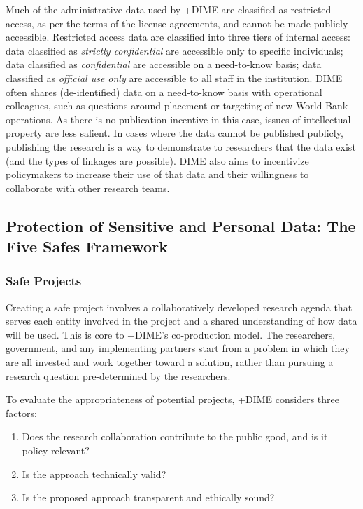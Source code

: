 \documentclass[
]{WileySix}
\providecommand{\tightlist}{%
  \setlength{\itemsep}{0pt}\setlength{\parskip}{0pt}}
\begin{document}
Much of the administrative data used by +DIME\textbar{} are classified as restricted access, as per the terms of the license agreements, and cannot be made publicly accessible. Restricted access data are classified into three tiers of internal access: data classified as \emph{strictly confidential} are accessible only to specific individuals; data classified as \emph{confidential} are accessible on a need-to-know basis; data classified as \emph{official use only} are accessible to all staff in the institution. DIME often shares (de-identified) data on a need-to-know basis with operational colleagues, such as questions around placement or targeting of new World Bank operations. As there is no publication incentive in this case, issues of intellectual property are less salient. In cases where the data cannot be published publicly, publishing the research is a way to demonstrate to researchers that the data exist (and the types of linkages are possible). DIME also aims to incentivize policymakers to increase their use of that data and their willingness to collaborate with other research teams.

\hypertarget{protection-of-sensitive-and-personal-data-the-five-safes-framework-7}{%
\subsection{Protection of Sensitive and Personal Data: The Five Safes Framework}\label{protection-of-sensitive-and-personal-data-the-five-safes-framework-7}}

\hypertarget{safe-projects-7}{%
\subsubsection{Safe Projects}\label{safe-projects-7}}

Creating a safe project involves a collaboratively developed research agenda that serves each entity involved in the project and a shared understanding of how data will be used. This is core to +DIME\textbar's co-production model. The researchers, government, and any implementing partners start from a problem in which they are all invested and work together toward a solution, rather than pursuing a research question pre-determined by the researchers.

To evaluate the appropriateness of potential projects, +DIME\textbar{} considers three factors:

\begin{enumerate}
\def\labelenumi{(\arabic{enumi})}
\tightlist
\item
  Does the research collaboration contribute to the public good, and is it policy-relevant?
\item
  Is the approach technically valid?
\item
  Is the proposed approach transparent and ethically sound?
\end{enumerate}
\end{document}
